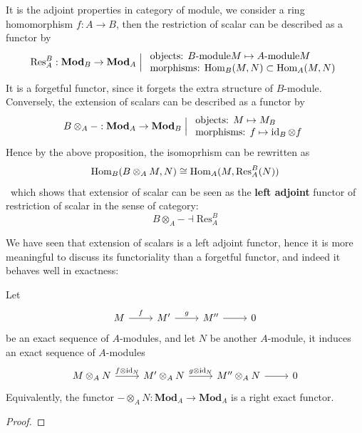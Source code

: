 \documentclass[12pt,a4paper]{article}
\begin{document}
\begin{remark}
    It is the adjoint properties in category of module, we consider a ring homomorphism \(f:A \to B\), then the restriction of scalar can be described as a functor by
    \[{\mathrm{Res}_A^B: \mathbf{Mod}_B \to \mathbf{Mod}_A} \;\Big|\; \begin{array}{l} \text{objects: }{B\text{-module}M \mapsto A\text{-module}M} \\ \text{morphisms: }{\operatorname{Hom}_B(M,N) \subset \operatorname{Hom}_A(M,N)} \end{array}\]
    It is a forgetful functor, since it forgets the extra structure of \(B\)-module. Conversely, the extension of scalars can be described as a functor by
    \[{B\otimes_A-: \mathbf{Mod}_A \to \mathbf{Mod}_B} \;\Big|\; \begin{array}{l} \text{objects: }{M \mapsto M_B} \\ \text{morphisms: }{f \mapsto \operatorname{id}_B \otimes f} \end{array}\]
    Hence by the above proposition, the isomoprhism can be rewritten as
    \[\operatorname{Hom}_{B}(B \otimes_A M,N) \cong \operatorname{Hom}_{A}(M, \mathrm{Res}_A^B(N))\]\
    which shows that extensior of scalar can be seen as the \textbf{left adjoint} functor of restriction of scalar in the sense of category:
    \[B\otimes_A- \dashv \mathrm{Res}_A^B\]
\end{remark}

We have seen that extension of scalars is a left adjoint functor, hence it is more meaningful to discuss its functoriality than a forgetful functor, and indeed it behaves well in exactness:
\begin{lemma}
    Let
\[\begin{tikzcd}
	M & {M'} & {M''} & 0
	\arrow["f", from=1-1, to=1-2]
	\arrow["g", from=1-2, to=1-3]
	\arrow[from=1-3, to=1-4]
\end{tikzcd}\]
    be an exact sequence of \(A\)-modules, and let \(N\) be another \(A\)-module, it induces an exact sequence of \(A\)-modules
\[\begin{tikzcd}
	{M\otimes_AN} & {M'\otimes_AN} & {M''\otimes_AN} & 0
	\arrow["f\otimes \id_N", from=1-1, to=1-2]
	\arrow["g\otimes \id_N", from=1-2, to=1-3]
	\arrow[from=1-3, to=1-4]
\end{tikzcd}\]
    Equivalently, the functor \( - \otimes_A N: \mathbf{Mod}_A \to \mathbf{Mod}_A\) is a right exact functor.
    
\end{lemma}
\begin{proof}
    
\end{proof}
\end{document}
